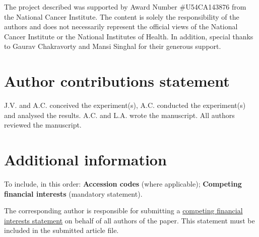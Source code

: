 \documentclass[fleqn,10pt]{wlscirep}
\begin{document}
The project described was supported by Award Number \#U54CA143876 from the National Cancer Institute.  
The content is solely the responsibility of the authors and does not necessarily represent the official views of the National Cancer Institute or the National Institutes of Health. 
In addition, special thanks to Gaurav Chakravorty and Mansi Singhal for their generous support. 

\section*{Author contributions statement}
J.V. and A.C. conceived the experiment(s), A.C. conducted the experiment(s) and analysed the results. A.C. and L.A. wrote the manuscript. All authors reviewed the manuscript.  


\section*{Additional information}

To include, in this order: \textbf{Accession codes} (where applicable); \textbf{Competing financial interests} (mandatory statement). 

The corresponding author is responsible for submitting a \href{http://www.nature.com/srep/policies/index.html#competing}{competing financial interests statement} on behalf of all authors of the paper. This statement must be included in the submitted article file.

%

%

%

\end{document}
